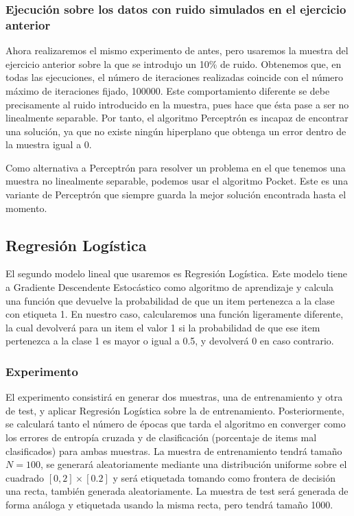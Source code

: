 \documentclass[10pt,a4paper]{article}
\begin{document}
\subsubsection{Ejecución sobre los datos con ruido simulados en el ejercicio anterior}

Ahora realizaremos el mismo experimento de antes, pero usaremos la muestra del ejercicio anterior sobre la que se introdujo un 10\% de ruido. Obtenemos que, en todas las ejecuciones, el número de iteraciones realizadas coincide con el número máximo de iteraciones fijado, 100000. Este comportamiento diferente se debe precisamente al ruido introducido en la muestra, pues hace que ésta pase a ser no linealmente separable. Por tanto, el algoritmo Perceptrón es incapaz de encontrar una solución, ya que no existe ningún hiperplano que obtenga un error dentro de la muestra igual a 0.

Como alternativa a Perceptrón para resolver un problema en el que tenemos una muestra no linealmente separable, podemos usar el algoritmo Pocket. Este es una variante de Perceptrón que siempre guarda la mejor solución encontrada hasta el momento.



\subsection{Regresión Logística}

El segundo modelo lineal que usaremos es Regresión Logística. Este modelo tiene a Gradiente Descendente Estocástico como algoritmo de aprendizaje y calcula una función que devuelve la probabilidad de que un item pertenezca a la clase con etiqueta 1. En nuestro caso, calcularemos una función ligeramente diferente, la cual devolverá para un item el valor 1 si la probabilidad de que ese item pertenezca a la clase 1 es mayor o igual a 0.5, y devolverá 0 en caso contrario.

\subsubsection{Experimento}

El experimento consistirá en generar dos muestras, una de entrenamiento y otra de test, y aplicar Regresión Logística sobre la de entrenamiento. Posteriormente, se calculará tanto el número de épocas que tarda el algoritmo en converger como los errores de entropía cruzada y de clasificación (porcentaje de items mal clasificados) para ambas muestras. La muestra de entrenamiento tendrá tamaño $N=100$, se generará aleatoriamente mediante una distribución uniforme sobre el cuadrado $[0,2] \times [0.2]$ y será etiquetada tomando como frontera de decisión una recta, también generada aleatoriamente. La muestra de test será generada de forma análoga y etiquetada usando la misma recta, pero tendrá tamaño 1000.
\end{document}
